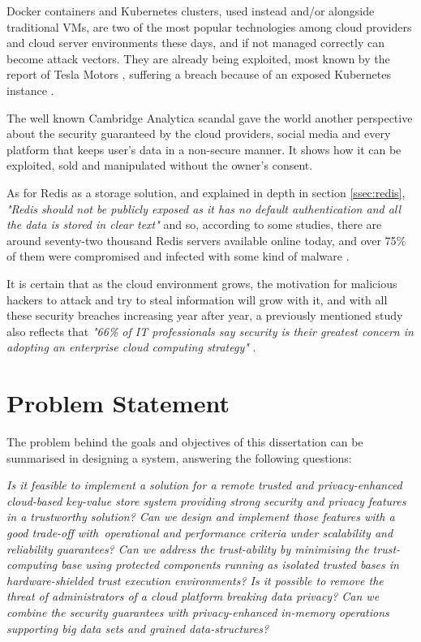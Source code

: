 Docker containers and Kubernetes clusters, used instead and/or alongside traditional \glspl{VM}, are two of the most popular technologies among cloud providers and cloud server environments these days, and if not managed correctly can become attack vectors. They are already being exploited, most known by the report of Tesla Motors \cite{tesla_leak:1}, suffering a breach because of an exposed Kubernetes instance \cite{docker_leak:1, kubernetes_leak:1}.

The well known Cambridge Analytica scandal \cite{cambridge_analytica:1} gave the world another perspective about the security guaranteed by the cloud providers, social media and every platform that keeps user's data in a non-secure manner. It shows how it can be exploited, sold and manipulated without the owner's consent.

As for Redis as a storage solution, and explained in depth in section \ref{ssec:redis}, \textit{"Redis should not be publicly exposed as it has no default authentication and all the data is stored in clear text"} and so, according to some studies, there are around seventy-two thousand Redis servers available online today, and over 75{\%} of them were compromised and infected with some kind of malware \cite{redis_leak:1, redis_leak:2, redis_leak:3}.

It is certain that as the cloud environment grows, the motivation for malicious hackers to attack and try to steal information will grow with it, and with all these security breaches increasing year after year, a previously mentioned study also reflects that \textit{"66{\%} of IT professionals say security is their greatest concern in adopting an enterprise cloud computing strategy"} \cite{cloud_statistic:1}.


\section{Problem Statement} %
\label{sec:problem_statement}

The problem behind the goals and objectives of this dissertation can be summarised in designing a system, answering the following questions:

\textit{Is it feasible to implement a solution for a remote trusted and privacy-enhanced cloud-based key-value store system providing strong security and privacy features in a trustworthy solution? Can we design and implement those features with a good trade-off with operational and performance criteria under scalability and reliability guarantees? Can we address the trust-ability by minimising the trust-computing base using protected components running as isolated trusted bases in hardware-shielded trust execution environments? Is it possible to remove the threat of administrators of a cloud platform breaking data privacy? Can we combine the security guarantees with privacy-enhanced in-memory operations supporting big data sets and grained data-structures?}

